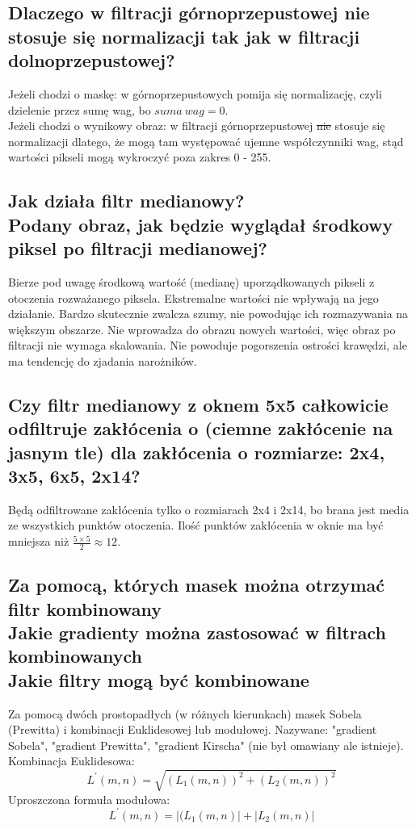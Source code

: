\documentclass[a4paper, 12pt, titlepage]{article}
\begin{document}
\subsection{Dlaczego w filtracji górnoprzepustowej nie stosuje się normalizacji tak jak w filtracji dolnoprzepustowej?}
Jeżeli chodzi o maskę: w górnoprzepustowych pomija się normalizację, czyli dzielenie przez sumę wag, bo $suma~wag = 0$. \\
Jeżeli chodzi o wynikowy obraz: w filtracji górnoprzepustowej \st{nie} stosuje się normalizacji dlatego, że mogą tam występować ujemne współczynniki wag, stąd wartości pikseli mogą wykroczyć poza zakres 0 - 255.

\subsection{Jak działa filtr medianowy? \\ Podany obraz, jak będzie wyglądał środkowy piksel po filtracji medianowej?}
Bierze pod uwagę środkową wartość (medianę) uporządkowanych pikseli z otoczenia rozważanego piksela. Ekstremalne wartości nie wpływają na jego działanie. Bardzo skutecznie zwalcza szumy, nie powodując ich rozmazywania na większym obszarze. Nie wprowadza do obrazu nowych wartości, więc obraz po filtracji nie wymaga skalowania. Nie powoduje pogorszenia ostrości krawędzi, ale ma tendencję do zjadania narożników.

\subsection{Czy filtr medianowy z oknem 5x5 całkowicie odfiltruje zakłócenia o (ciemne zakłócenie na jasnym tle) dla zakłócenia o rozmiarze: 2x4, 3x5, 6x5, 2x14?}
Będą odfiltrowane zakłócenia tylko o rozmiarach 2x4 i 2x14, bo brana jest media ze wszystkich punktów otoczenia. Ilość punktów zakłócenia w oknie ma być mniejsza niż $\frac{5\times5}{2}\approx12$.

\subsection{Za pomocą, których masek można otrzymać filtr kombinowany \\ Jakie gradienty można zastosować w filtrach kombinowanych \\ Jakie filtry mogą być kombinowane}
Za pomocą dwóch prostopadłych (w różnych kierunkach) masek Sobela (Prewitta) i kombinacji Euklidesowej lub modułowej. Nazywane: "gradient Sobela", "gradient Prewitta", "gradient Kirscha" (nie był omawiany ale istnieje). \\
Kombinacja Euklidesowa:
$$ L^{\prime}(m,n) = \sqrt{(L_{1}(m,n))^2+(L_{2}(m,n))^2} $$
Uproszczona formuła modułowa:
$$ L^{\prime}(m,n) = |(L_{1}(m,n)|+|L_{2}(m,n)| $$
\end{document}
